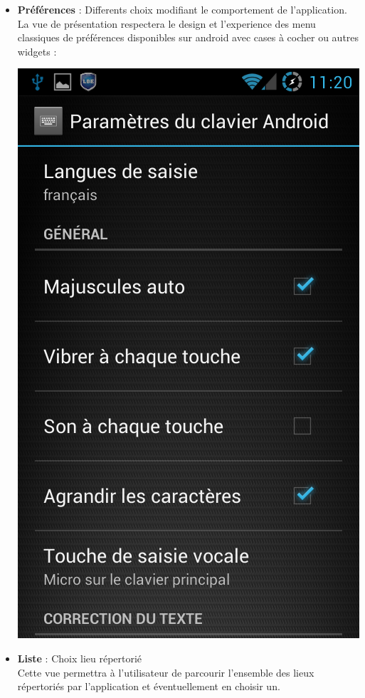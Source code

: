 \documentclass{report}
\begin{document}
\begin{itemize}
\begin{center}
		\end{center}
	\item \textbf{Préférences} : Differents choix modifiant le comportement de l'application. \\
	La vue de présentation respectera le design et l'experience des menu classiques de préférences disponibles sur android avec cases à cocher ou autres widgets :
		\begin{center}
			\includegraphics[scale=0.35]{preferences.png}
		\end{center}
	\item \textbf{Liste} : Choix lieu répertorié \\
	Cette vue permettra à l'utilisateur de parcourir l'ensemble des lieux répertoriés par l'application et éventuellement en choisir un.
	\end{itemize}
	
\end{document}
